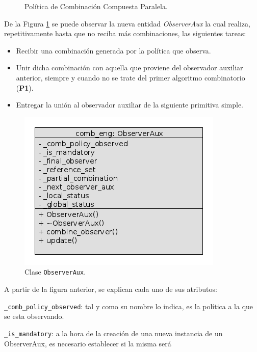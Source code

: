 \begin{itemize}
\begin{figure}[H]
	     				\caption{Pol\'itica de Combinaci\'on Compuesta Paralela.}
              \label{parallelComb}
	     			\end{figure}
            \newpage
            De la Figura \ref{parallelComb} se puede observar la nueva entidad \textit{ObserverAux} la cual realiza, repetitivamente hasta que no
            reciba m\'as combinaciones, las siguientes tareas:
            \begin{itemize}
              \item Recibir una combinaci\'on generada por la pol\'itica que observa.
              \item Unir dicha combinaci\'on con aquella que proviene del observador auxiliar anterior, siempre y cuando no se trate del primer
                algoritmo combinatorio (\textbf{P1}). 
              \item Entregar la uni\'on al observador auxiliar de la siguiente primitiva simple. 
            \end{itemize}
            \begin{figure}[H]\hspace{2.8cm}
              \includegraphics[scale=.6]{images/observer_aux_class.png}
              \caption{Clase \texttt{ObserverAux}.}
              \label{observerAux}
            \end{figure}
            A partir de la figura anterior, se explican cada uno de sus atributos:
            \begin{description}
              \item \texttt{\_comb\_policy\_observed}: tal y como su nombre lo indica, es la pol\'itica a la que se esta observando.
              \item \texttt{\_is\_mandatory}: a la hora de la creaci\'on de una nueva instancia de un ObserverAux, es necesario establecer si la misma ser\'a

\end{description}
\end{itemize}
